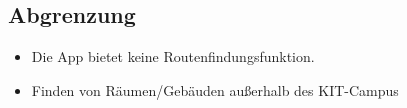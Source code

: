 \subsection{Abgrenzung}

\begin{itemize}

    \item Die App bietet keine Routenfindungsfunktion. 
    \item Finden von Räumen/Gebäuden außerhalb des KIT-Campus

\end{itemize}